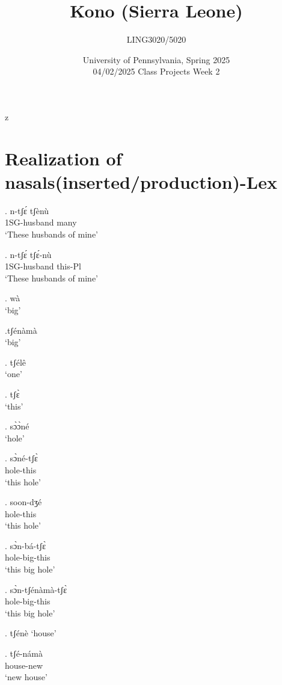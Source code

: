 z   \documentclass{assets/fieldnotes}
\title{Kono (Sierra Leone)}
\author{LING3020/5020}
\date{University of Pennsylvania, Spring 2025\\04/02/2025 Class Projects Week 2}
\begin{document}
\maketitle

\maketitle
\tableofcontents

\section{Realization of nasals(inserted/production)-Lex}


     
   
\exg.  n-tʃɛ́ tʃènù\\
1SG-husband many \\
`These husbands of mine'


\exg.  n-tʃɛ́ tʃɛ́-nù\\
1SG-husband this-Pl \\
`These husbands of mine'

\ex. wà\\
`big'

\ex.tʃénàmà\\
`big'

\ex. tʃélê\\
`one'

\ex.  tʃɛ̀\\
`this'

\ex. sɔ̀ɔ̀né\\
`hole'

\exg. sɔ̀né-tʃɛ̀ \\
hole-this\\
`this hole' 

\exg. soon-dʒé\\
hole-this\\
`this hole' 


\exg. sɔ̀n-bá-tʃɛ̀\\
hole-big-this\\
`this big hole'

\exg. sɔ̀n-tʃénàmà-tʃɛ̀\\
hole-big-this\\
`this big hole'


\ex. tʃénè
`house'

\exg. tʃé-námà\\
house-new\\
`new house'
\end{document}
